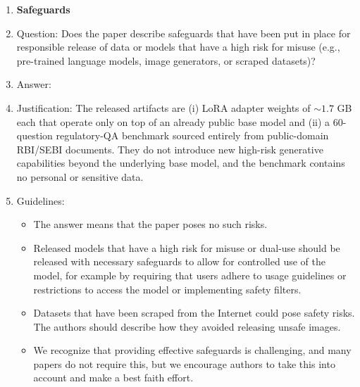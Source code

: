 \begin{enumerate}
\begin{itemize}
        \item If there are negative societal impacts, the authors could also discuss possible mitigation strategies (e.g., gated release of models, providing defenses in addition to attacks, mechanisms for monitoring misuse, mechanisms to monitor how a system learns from feedback over time, improving the efficiency and accessibility of ML).
    \end{itemize}
    
\item {\bf Safeguards}
    \item[] Question: Does the paper describe safeguards that have been put in place for responsible release of data or models that have a high risk for misuse (e.g., pre-trained language models, image generators, or scraped datasets)?
    \item[] Answer: \answerNA{}
    \item[] Justification: The released artifacts are (i) LoRA adapter weights of $\sim 1.7$ GB each that operate only on top of an already public base model and (ii) a 60-question regulatory-QA benchmark sourced entirely from public-domain RBI/SEBI documents. They do not introduce new high-risk generative capabilities beyond the underlying base model, and the benchmark contains no personal or sensitive data.
    \item[] Guidelines:
    \begin{itemize}
        \item The answer \answerNA{} means that the paper poses no such risks.
        \item Released models that have a high risk for misuse or dual-use should be released with necessary safeguards to allow for controlled use of the model, for example by requiring that users adhere to usage guidelines or restrictions to access the model or implementing safety filters. 
        \item Datasets that have been scraped from the Internet could pose safety risks. The authors should describe how they avoided releasing unsafe images.
        \item We recognize that providing effective safeguards is challenging, and many papers do not require this, but we encourage authors to take this into account and make a best faith effort.
    \end{itemize}


\end{enumerate}
